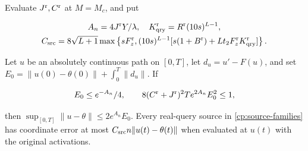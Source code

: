 Evaluate $J^{\rm r},C^{\rm r}$ at $M=M_c$, and put

\begin{equation}
\label{cp:init:eq:real-source-constant}
\begin{gathered}
A_n=4J^{\rm r}Y/\lambda,\quad
K_{\rm qry}^{\rm r}=R^{\rm r}(10s)^{L-1},\\
C_{\rm src}=8\sqrt{L+1}\max\left\{sF_z^{\rm r},
 (10s)^{L-1}[s(1+B^{\rm r})+Lt_2F_z^{\rm r}K_{\rm qry}^{\rm r}]\right\}.
\end{gathered}
\end{equation}

\begin{lemma}
\label{cp:init:defect}

Let $u$ be an absolutely continuous path on $[0,T]$, let
$d_u=u'-F(u)$, and set
$E_0=\|u(0)-\theta(0)\|+\int_0^T\|d_u\|$.
If

\[
E_0\le e^{-A_n}/4,\qquad
8(C^{\rm r}+J^{\rm r})^2Te^{2A_n}E_0^2\le1,
\]

then $\sup_{[0,T]}\|u-\theta\|\le2e^{A_n}E_0$.
Every real-query source in \eqref{cp:source-families} has coordinate
error at most $C_{\rm src}n\|u(t)-\theta(t)\|$ when evaluated at
$u(t)$ with the original activations.
\end{lemma}

